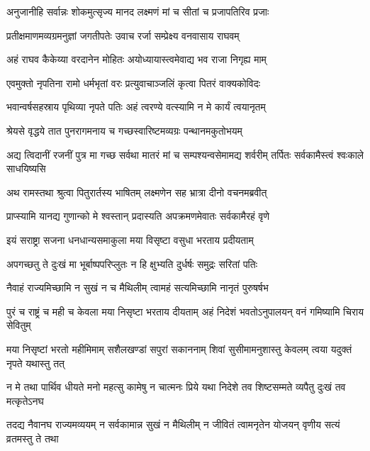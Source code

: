 \twolineshloka
{अनुजानीहि सर्वान्नः शोकमुत्सृज्य मानद}
{लक्ष्मणं मां च सीतां च प्रजापतिरिव प्रजाः} %

\twolineshloka
{प्रतीक्षमाणमव्यग्रमनुज्ञां जगतीपतेः}
{उवाच रर्जा सम्प्रेक्ष्य वनवासाय राघवम्} %

\twolineshloka
{अहं राघव कैकेय्या वरदानेन मोहितः}
{अयोध्यायास्त्वमेवाद्य भव राजा निगृह्य माम्} %

\twolineshloka
{एवमुक्तो नृपतिना रामो धर्मभृतां वरः}
{प्रत्युवाचाञ्जलिं कृत्वा पितरं वाक्यकोविदः} %

\twolineshloka
{भवान्वर्षसहस्राय पृथिव्या नृपते पतिः}
{अहं त्वरण्ये वत्स्यामि न मे कार्यं त्वयानृतम्} %

\twolineshloka
{श्रेयसे वृद्धये तात पुनरागमनाय च}
{गच्छस्वारिष्टमव्यग्रः पन्थानमकुतोभयम्} %

\threelineshloka
{अद्य त्विदानीं रजनीं पुत्र मा गच्छ सर्वथा}
{मातरं मां च सम्पश्यन्वसेमामद्य शर्वरीम्}
{तर्पितः सर्वकामैस्त्वं श्वःकाले साधयिष्यसि} %

\twolineshloka
{अथ रामस्तथा श्रुत्वा पितुरार्तस्य भाषितम्}
{लक्ष्मणेन सह भ्रात्रा दीनो वचनमब्रवीत्} %

\twolineshloka
{प्राप्स्यामि यानद्य गुणान्को मे श्वस्तान् प्रदास्यति}
{अपक्रमणमेवातः सर्वकामैरहं वृणे} %

\twolineshloka
{इयं सराष्ट्रा सजना धनधान्यसमाकुला}
{मया विसृष्टा वसुधा भरताय प्रदीयताम्} %

\twolineshloka
{अपगच्छतु ते दुःखं मा भूर्बाष्पपरिप्लुतः}
{न हि क्षुभ्यति दुर्धर्षः समुद्रः सरितां पतिः} %

\twolineshloka
{नैवाहं राज्यमिच्छामि न सुखं न च मैथिलीम्}
{त्वामहं सत्यमिच्छामि नानृतं पुरुषर्षभ} %

\fourlineindentedshloka
{पुरं च राष्ट्रं च मही च केवला}
{मया निसृष्टा भरताय दीयताम्}
{अहं निदेशं भवतोऽनुपालयन्}
{वनं गमिष्यामि चिराय सेवितुम्} %

\fourlineindentedshloka
{मया निसृष्टां भरतो महीमिमाम्}
{सशैलखण्डां सपुरां सकाननाम्}
{शिवां सुसीमामनुशास्तु केवलम्}
{त्वया यदुक्तं नृपते यथास्तु तत्} %

\fourlineindentedshloka
{न मे तथा पार्थिव धीयते मनो}
{महत्सु कामेषु न चात्मनः प्रिये}
{यथा निदेशे तव शिष्टसम्मते}
{व्यपैतु दुःखं तव मत्कृतेऽनघ} %

\fourlineindentedshloka
{तदद्य नैवानघ राज्यमव्ययम्}
{न सर्वकामान्न सुखं न मैथिलीम्}
{न जीवितं त्वामनृतेन योजयन्}
{वृणीय सत्यं व्रतमस्तु ते तथा} %

